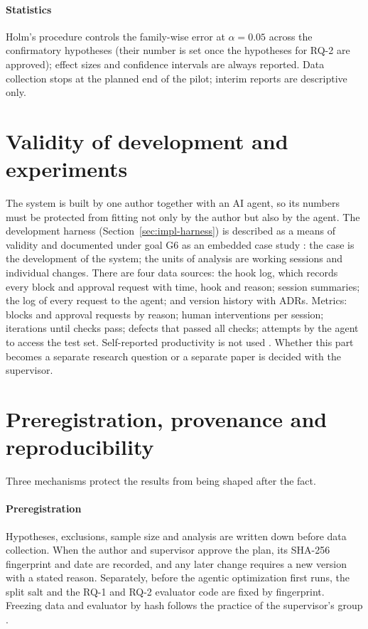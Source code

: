 \paragraph{Statistics} Holm's procedure controls the family-wise error
at $\alpha=0.05$ across the confirmatory hypotheses (their number is set once the hypotheses for RQ-2 are approved); effect sizes and confidence intervals are always
reported. Data collection stops at the planned end of the pilot; interim reports are descriptive only.

\section{Validity of development and experiments}\label{sec:method-harness}

The system is built by one author together with an AI agent, so its numbers must be protected from fitting not
only by the author but also by the agent. The development harness (Section~\ref{sec:impl-harness}) is described
as a means of validity and documented under goal G6 as an embedded case study \cite{SRC-102}: the case is the
development of the system; the units of analysis are working sessions and individual changes. There are four
data sources: the hook log, which records every block and approval request with time, hook and reason; session
summaries; the log of every request to the agent; and version history with ADRs. Metrics: blocks and approval
requests by reason; human interventions per session; iterations until checks pass; defects that passed all
checks; attempts by the agent to access the test set. Self-reported productivity is not used \cite{SRC-030}.
Whether this part becomes a separate research question or a separate paper is decided with the supervisor.

\section{Preregistration, provenance and reproducibility}\label{sec:method-prov}

Three mechanisms protect the results from being shaped after the fact.

\paragraph{Preregistration} Hypotheses, exclusions, sample size and analysis are written down before data
collection. When the author and supervisor approve the plan, its SHA-256 fingerprint and date are recorded,
and any later change requires a new version with a stated reason. Separately, before the agentic optimization first runs, the split salt and the RQ-1 and RQ-2 evaluator code are fixed
by fingerprint. Freezing data and
evaluator by hash follows the practice of the supervisor's group \cite{SRC-067}.


